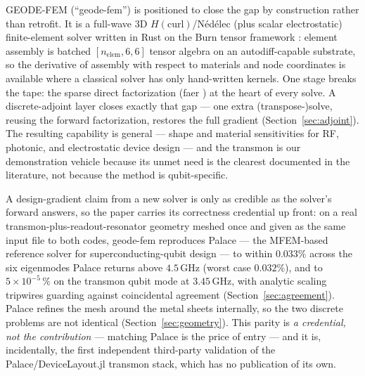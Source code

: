 \documentclass{anvil-paper}
\begin{document}
GEODE-FEM (``geode-fem'') is positioned to close the gap by construction
rather than retrofit. It is a full-wave 3D $H(\mathrm{curl})$/N\'ed\'elec
(plus scalar electrostatic) finite-element solver written in Rust on the
Burn tensor framework \citep{burn}: element assembly is batched
$[n_{\mathrm{elem}},6,6]$ tensor algebra on an autodiff-capable substrate,
so the derivative of assembly with respect to materials and node
coordinates is available where a classical solver has only hand-written
kernels. One stage breaks the tape: the sparse direct factorization
(faer \citep{kazdadi2026faer}) at the heart of every solve. A
discrete-adjoint layer closes exactly that gap --- one extra
(transpose-)solve, reusing the forward factorization, restores the full
gradient (Section~\ref{sec:adjoint}). The resulting capability is
general --- shape and material sensitivities for RF, photonic, and
electrostatic device design --- and the transmon is our demonstration
vehicle because its unmet need is the clearest documented in the
literature, not because the method is qubit-specific.

A design-gradient claim from a new solver is only as credible as the
solver's forward answers, so the paper carries its correctness credential
up front: on a real transmon-plus-readout-resonator geometry meshed once
and given as the same input file to both codes, geode-fem reproduces
Palace --- the MFEM-based \citep{mfem,andrej2024high} reference solver
for superconducting-qubit design --- to within $0.033\%$ across the six
eigenmodes Palace returns above $4.5$\,GHz (worst case $0.032\%$), and to
$5\times10^{-5}\,\%$ on the transmon qubit mode at $3.45$\,GHz, with
analytic scaling tripwires guarding against coincidental agreement
(Section~\ref{sec:agreement}). Palace refines the mesh around the metal
sheets internally, so the two discrete problems are not identical
(Section~\ref{sec:geometry}). This parity is \emph{a credential, not the
contribution} --- matching Palace is the price of entry --- and it is,
incidentally, the first independent third-party validation of the
Palace/DeviceLayout.jl transmon stack, which has no publication of its
own.
\end{document}
